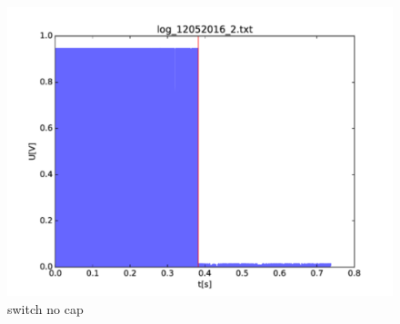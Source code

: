 \begin{figure}
	\begin{center}
		\includegraphics[width=\textwidth]{images/switch_nocap.pdf} 
		\caption{switch no cap}
	\end{center}
\end{figure}
